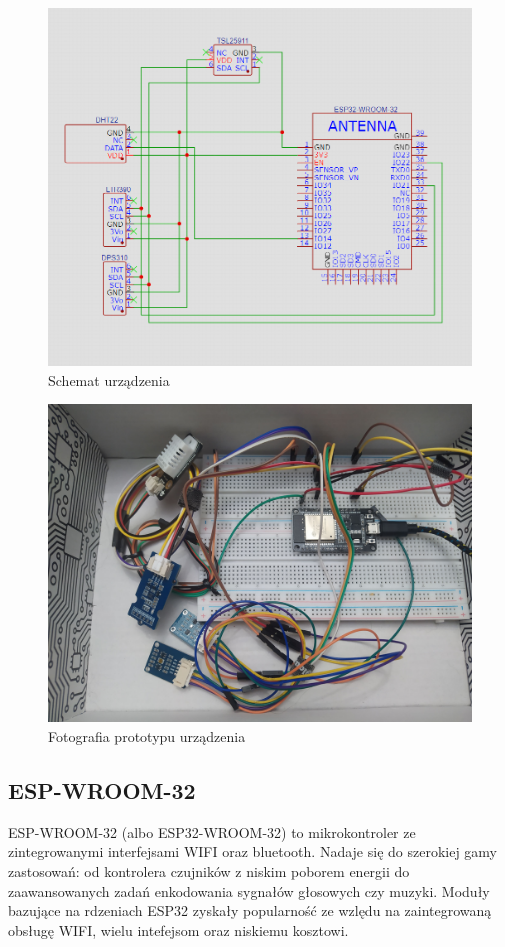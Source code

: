\documentclass[12pt,a4paper]{article}
\begin{document}
\begin{figure}[H]
    \centering
    \includegraphics[width=\textwidth]{device-schematic.png}
    \caption{Schemat urządzenia}
    \label{device-schematic}
\end{figure}

\begin{figure}[H]
    \centering
    \includegraphics[width=\textwidth]{device-image.jpg}
    \caption{Fotografia prototypu urządzenia}
    \label{device-image}
\end{figure}

\subsection{ESP-WROOM-32}
ESP-WROOM-32 (albo ESP32-WROOM-32) to mikrokontroler ze zintegrowanymi interfejsami WIFI oraz bluetooth. Nadaje się do szerokiej gamy zastosowań: od kontrolera czujników z niskim poborem energii do zaawansowanych zadań enkodowania sygnałów głosowych czy muzyki. Moduły bazujące na rdzeniach ESP32 zyskały popularność ze wzlędu na zaintegrowaną obsługę WIFI,  wielu intefejsom oraz niskiemu kosztowi.
\end{document}
